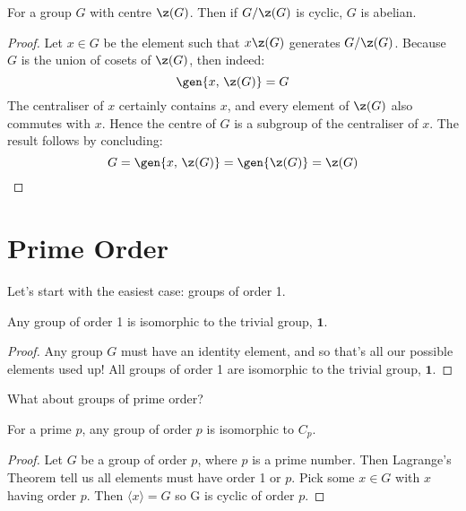 \begin{lemma}\label{lem:cyclic_over_centre}
    \raggedright
    For a group \(G\) with centre \(\z(G)\).
    Then if \(G/\z(G)\) is cyclic, \(G\) is abelian.
\end{lemma}

\begin{proof}
    Let \(x \in G\) be the element such that \(x\z(G)\) generates \(G/\z(G)\).
    Because \(G\) is the union of cosets of \(\z(G)\), then indeed:
    \[\gen{x,\,\z(G)} = G\]
    The centraliser of \(x\) certainly contains \(x\), and every element of \(\z(G)\) also commutes with \(x\).
    Hence the centre of \(G\) is a subgroup of the centraliser of \(x\).
    The result follows by concluding:
    \[G = \gen{x,\,\z(G)} = \gen{\z(G)} = \z(G)\]
\end{proof}

\section{Prime Order}
Let's start with the easiest case: groups of order 1.
\begin{theorem}
    Any group of order 1 is isomorphic to the trivial group, \(\bm{1}\).
\end{theorem}

\begin{proof}
    Any group \(G\) must have an identity element, and so that's all our possible elements used up!
    All groups of order 1 are isomorphic to the trivial group, \(\bm{1}\).
\end{proof}


What about groups of prime order?
\begin{theorem}
    For a prime \(p\), any group of order \(p\) is isomorphic to \(C_p\).
\end{theorem}

\begin{proof}
    Let \(G\) be a group of order \(p\), where \(p\) is a prime number.
    Then Lagrange's Theorem tell us all elements must have order 1 or \(p\).
    Pick some \(x \in G\) with \(x\) having order \(p\).
    Then \(\langle x \rangle = G\) so G is cyclic of order \(p\).
\end{proof}

